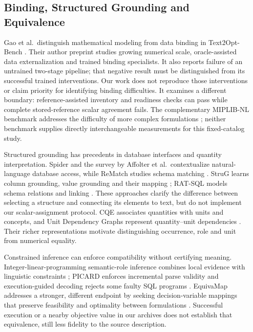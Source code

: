 \documentclass[pdflatex,iicol,sn-basic,Numbered]{sn-jnl}
\begin{document}
\subsection{Binding, Structured Grounding and Equivalence}
\label{subsec:rw_binding}
Gao et al.\ distinguish mathematical modeling from data binding in Text2Opt-Bench \cite{gao2026models}. Their author preprint studies growing numerical scale, oracle-assisted data externalization and trained binding specialists. It also reports failure of an untrained two-stage pipeline; that negative result must be distinguished from its successful trained interventions. Our work does not reproduce those interventions or claim priority for identifying binding difficulties. It examines a different boundary: reference-assisted inventory and readiness checks can pass while complete stored-reference scalar agreement fails. The complementary MIPLIB-NL benchmark addresses the difficulty of more complex formulations \cite{miplibnl2026}; neither benchmark supplies directly interchangeable measurements for this fixed-catalog study.

Structured grounding has precedents in database interfaces and quantity interpretation. Spider and the survey by Affolter et al.\ contextualize natural-language database access, while ReMatch studies schema matching \cite{yu2018spider,affolter2019nli,sheetrit2024rematch}. StruG learns column grounding, value grounding and their mapping \cite{deng2021strug}; RAT-SQL models schema relations and linking \cite{wang2020ratsql}. These approaches clarify the difference between selecting a structure and connecting its elements to text, but do not implement our scalar-assignment protocol. CQE associates quantities with units and concepts, and Unit Dependency Graphs represent quantity--unit dependencies \cite{almasian2023cqe,roy2017udg}. Their richer representations motivate distinguishing occurrence, role and unit from numerical equality.

Constrained inference can enforce compatibility without certifying meaning. Integer-linear-programming semantic-role inference combines local evidence with linguistic constraints \cite{punyakanok2004ilp}; PICARD enforces incremental parse validity and execution-guided decoding rejects some faulty SQL programs \cite{scholak2021picard,wang2018execution}. EquivaMap addresses a stronger, different endpoint by seeking decision-variable mappings that preserve feasibility and optimality between formulations \cite{zhai2025equivamap}. Successful execution or a nearby objective value in our archives does not establish that equivalence, still less fidelity to the source description.
\end{document}
